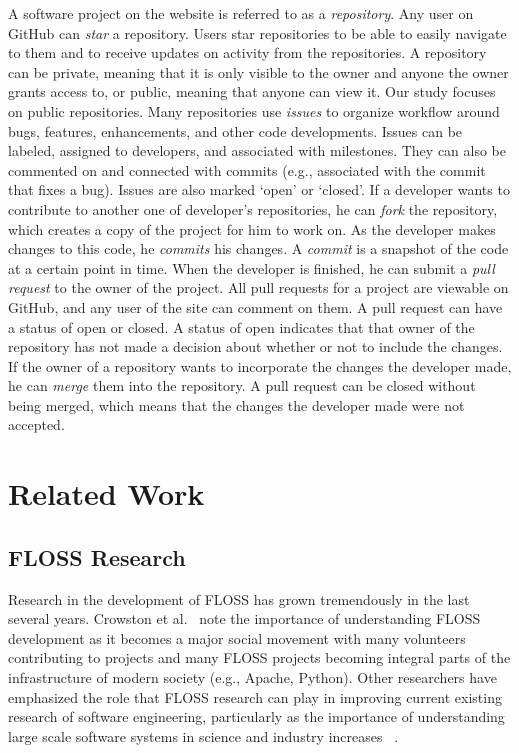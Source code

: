 \documentclass{sigchi}
\begin{document}
A software project on the website is referred to as a \textit{repository}. Any
user on GitHub can \textit{star} a repository. Users star repositories to be
able to easily navigate to them and to receive updates on activity from the
repositories. A repository can be private, meaning that it is only visible to
the owner and anyone the owner grants access to, or public, meaning that anyone
can view it. Our study focuses on public repositories. Many repositories use \textit{issues} to organize workflow around bugs, features, enhancements, and other code 
developments. Issues can be labeled, assigned to developers, and associated with milestones. They can also be commented on and connected with commits (e.g., 
associated with the commit that fixes a bug). Issues are also marked `open' or `closed'. If a developer wants to
contribute to another one of developer's repositories, he can \textit{fork} the
repository, which creates a copy of the project for him to work on. As the
developer makes changes to this code, he \textit{commits} his changes. A
\textit{commit} is a snapshot of the code at a certain point in time. When the
developer is finished, he can submit a \textit{pull request} to the owner of the
project. All pull requests for a project are viewable on GitHub, and any user of
the site can comment on them. A pull request can have a status of open or
closed. A status of open indicates that that owner of the repository has not
made a decision about whether or not to include the changes. If the owner of a
repository wants to incorporate the changes the developer made, he can
\textit{merge} them into the repository. A pull request can be closed without
being merged, which means that the changes the developer made were not accepted.

\section{Related Work} \label{sec:relatedwork}

\subsection{FLOSS Research}
Research in the development of FLOSS has grown
tremendously in the last several years.  Crowston et
al.~\cite{crowston_free/libre_2008} note the importance of understanding FLOSS
development as it becomes a major social movement with many volunteers
contributing to projects and many FLOSS projects becoming integral parts of the
infrastructure of modern society (e.g., Apache, Python). Other researchers have emphasized the role that
FLOSS research can play in improving current existing research of software
engineering, particularly as the importance of understanding large scale
software systems in science and industry increases
~\cite{scacchi_free/open_2007}.
\end{document}
